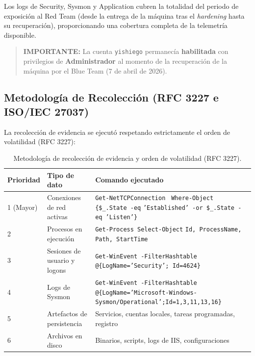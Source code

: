 Los logs de Security, Sysmon y Application cubren la totalidad del periodo de exposición al Red Team (desde la entrega de la máquina tras el \textit{hardening} hasta su recuperación), proporcionando una cobertura completa de la telemetría disponible.

\begin{quote}
\textbf{IMPORTANTE:} La cuenta \texttt{yishiego} permanecía \textbf{habilitada} con privilegios de \textbf{Administrador} al momento de la recuperación de la máquina por el Blue Team (7 de abril de 2026).
\end{quote}

\subsection{Metodología de Recolección (RFC 3227 e ISO/IEC 27037)}
La recolección de evidencia se ejecutó respetando estrictamente el orden de volatilidad (RFC 3227):

\begin{table}[htbp]
\centering
\setlength{\tabcolsep}{6pt}
\small
\begin{tabular}{|p{}|p{}|p{}|}
\hline
\textbf{Prioridad} & \textbf{Tipo de dato} & \textbf{Comando ejecutado} \\ \hline
1 (Mayor) & Conexiones de red activas & \texttt{Get-NetTCPConnection} \newline \texttt{\textbar{} Where-Object \{\$\_.State -eq} \newline \texttt{'Established' -or \$\_.State -eq 'Listen'\}} \\ \hline
2 & Procesos en ejecución & \texttt{Get-Process \textbar{} Select-Object} \newline \texttt{Id,}\allowbreak\texttt{ ProcessName,}\allowbreak\texttt{ Path,}\allowbreak\texttt{ StartTime} \\ \hline
3 & Sesiones de usuario y logons & \texttt{Get-WinEvent -FilterHashtable} \newline \texttt{@\{LogName='Security';}\allowbreak\texttt{ Id=4624\}} \\ \hline
4 & Logs de Sysmon & \texttt{Get-WinEvent -FilterHashtable} \newline \texttt{@\{LogName='Microsoft-}\allowbreak\texttt{Windows-}\allowbreak\texttt{Sysmon/Operational';}\allowbreak\texttt{Id=1,3,11,13,16\}} \\ \hline
5 & Artefactos de persistencia & Servicios, cuentas locales, tareas programadas, registro \\ \hline
6 & Archivos en disco & Binarios, scripts, logs de IIS, configuraciones \\ \hline
\end{tabular}
\caption{Metodología de recolección de evidencia y orden de volatilidad (RFC 3227).}
\label{tab:recoleccion_evidencia}
\end{table}

